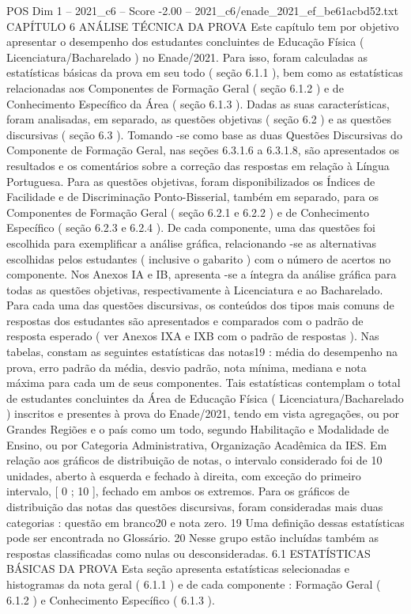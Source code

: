 \begin{textsample}{POS Dim 1 – 2021\_c6 – Score -2.00 – 2021\_c6/enade\_2021\_ef\_be61acbd52.txt}  \label{ex:f1_pos_210}
CAPÍTULO 6 ANÁLISE TÉCNICA DA PROVA Este capítulo tem por objetivo apresentar o desempenho dos estudantes concluintes de Educação Física ( Licenciatura/Bacharelado ) no Enade/2021.
Para isso, foram calculadas as estatísticas básicas da prova em seu todo ( seção 6.1.1 ), bem como as estatísticas relacionadas aos Componentes de Formação Geral ( seção 6.1.2 ) e de Conhecimento Específico da Área ( seção 6.1.3 ).
Dadas as suas características, foram analisadas, em separado, as questões objetivas ( seção 6.2 ) e as questões discursivas ( seção 6.3 ).
Tomando -se como base as duas Questões Discursivas do Componente de Formação Geral, nas seções 6.3.1.6 a 6.3.1.8, são apresentados os resultados e os comentários sobre a correção das respostas em relação à Língua Portuguesa.
Para as questões objetivas, foram disponibilizados os Índices de Facilidade e de Discriminação Ponto-Bisserial, também em separado, para os Componentes de Formação Geral ( seção 6.2.1 e 6.2.2 ) e de Conhecimento Específico ( seção 6.2.3 e 6.2.4 ).
De cada componente, uma das questões foi escolhida para exemplificar a análise gráfica, relacionando -se as alternativas escolhidas pelos estudantes ( inclusive o gabarito ) com o número de acertos no componente.
Nos Anexos IA e IB, apresenta -se a íntegra da análise gráfica para todas as questões objetivas, respectivamente à Licenciatura e ao Bacharelado.
Para cada uma das questões discursivas, os conteúdos dos tipos mais comuns de respostas dos estudantes são apresentados e comparados com o padrão de resposta esperado ( ver Anexos IXA e IXB com o padrão de respostas ).
Nas tabelas, constam as seguintes estatísticas das notas19 : média do desempenho na prova, erro padrão da média, desvio padrão, nota mínima, mediana e nota máxima para cada um de seus componentes.
Tais estatísticas contemplam o total de estudantes concluintes da Área de Educação Física ( Licenciatura/Bacharelado ) inscritos e presentes à prova do Enade/2021, tendo em vista agregações, ou por Grandes Regiões e o país como um todo, segundo Habilitação e Modalidade de Ensino, ou por Categoria Administrativa, Organização Acadêmica da IES.
Em relação aos gráficos de distribuição de notas, o intervalo considerado foi de 10 unidades, aberto à esquerda e fechado à direita, com exceção do primeiro intervalo, [ 0 ; 10 ], fechado em ambos os extremos.
Para os gráficos de distribuição das notas das questões discursivas, foram consideradas mais duas categorias : questão em branco20 e nota zero. 19 Uma definição dessas estatísticas pode ser encontrada no Glossário. 20 Nesse grupo estão incluídas também as respostas classificadas como nulas ou desconsideradas. 6.1 ESTATÍSTICAS BÁSICAS DA PROVA Esta seção apresenta estatísticas selecionadas e histogramas da nota geral ( 6.1.1 ) e de cada componente : Formação Geral ( 6.1.2 ) e Conhecimento Específico ( 6.1.3 ).

\end{textsample}
